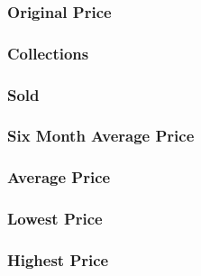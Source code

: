 \documentclass[
]{article}
\begin{document}
\hypertarget{original-price}{%
\subsubsection{Original Price}\label{original-price}}

\hypertarget{collections}{%
\subsubsection{Collections}\label{collections}}

\hypertarget{sold}{%
\subsubsection{Sold}\label{sold}}

\hypertarget{six-month-average-price}{%
\subsubsection{Six Month Average Price}\label{six-month-average-price}}

\hypertarget{average-price}{%
\subsubsection{Average Price}\label{average-price}}

\hypertarget{lowest-price}{%
\subsubsection{Lowest Price}\label{lowest-price}}

\hypertarget{highest-price}{%
\subsubsection{Highest Price}\label{highest-price}}
\end{document}
